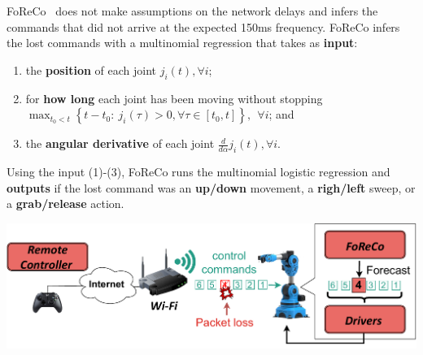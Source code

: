 \documentclass[a0,portrait]{a0poster}
\begin{document}
\begin{multicols}{2}
FoReCo~\cite{foreco} does not make assumptions on the network
delays and infers the commands that did not arrive
at the expected 150ms frequency.
FoReCo infers the lost commands with a
multinomial regression that takes as \textbf{input}:
\begin{enumerate}
    \item the \textbf{position} of each joint $j_i(t), \forall i$;
    \item for \textbf{how long} each joint has
    been moving without stopping\\
    $\max_{t_0<t}\left\{t-t_0:\ j_i(\tau)>0, \forall\tau\in[t_0,t]\right\},\ \ \forall i$; and
    \item the \textbf{angular derivative} of each joint $\tfrac{d}{d\alpha}j_i(t), \forall i$.
\end{enumerate}
Using the input (1)-(3),
FoReCo runs the multinomial logistic
regression and \textbf{outputs}
if the lost command
was an \textbf{up/down} movement,
a \textbf{righ/left} sweep, 
or a \textbf{grab/release} action.



\begin{center}\vspace{1cm}
    \includegraphics[width=\linewidth]{figures/experimental-setup-standalone.pdf}
    \label{fig:foreco}
\end{center}\vspace{1cm}





\end{multicols}
\end{document}
